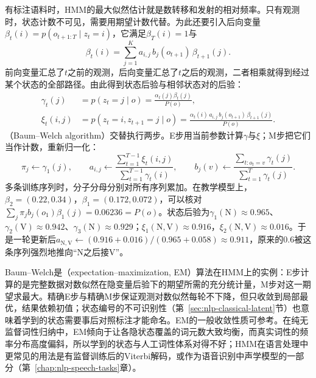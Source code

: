 有标注语料时，HMM的最大似然估计就是数转移和发射的相对频率。只有观测时，状态计数不可见，需要用期望计数代替。为此还要引入后向变量$\beta_t(i)=p(o_{t+1:T}\mid z_t=i)$，它满足$\beta_T(i)=1$与
\[
  \beta_t(i)=\sum_{j=1}^{K}a_{i,j}\,b_j(o_{t+1})\,\beta_{t+1}(j).
\]
前向变量汇总了$t$之前的观测，后向变量汇总了$t$之后的观测，二者相乘就得到经过某个状态的全部路径。由此得到状态后验与相邻状态对的后验：
\begin{equation}
  \begin{aligned}
    \gamma_t(j)&=p(z_t=j\mid o)=\frac{\alpha_t(j)\beta_t(j)}{P(o)},\\
    \xi_t(i,j)&=p(z_t=i,z_{t+1}=j\mid o)=\frac{\alpha_t(i)\,a_{i,j}\,b_j(o_{t+1})\,\beta_{t+1}(j)}{P(o)}.
  \end{aligned}
  \label{eq:nlp-classical-posteriors}
\end{equation}
（Baum--Welch algorithm）交替执行两步。E步用当前参数计算$\gamma$与$\xi$；M步把它们当作计数，重新归一化：
\begin{equation}
  \pi_j\gets\gamma_1(j),\qquad
  a_{i,j}\gets\frac{\sum_{t=1}^{T-1}\xi_t(i,j)}{\sum_{t=1}^{T-1}\gamma_t(i)},\qquad
  b_j(v)\gets\frac{\sum_{t:o_t=v}\gamma_t(j)}{\sum_{t=1}^{T}\gamma_t(j)}.
  \label{eq:nlp-classical-baum-welch}
\end{equation}
多条训练序列时，分子分母分别对所有序列累加。在教学模型上，$\beta_2=(0.22,0.34)$，$\beta_1=(0.172,0.072)$，可以核对$\sum_j\pi_jb_j(o_1)\beta_1(j)=0.06236=P(o)$。状态后验为$\gamma_1(\mathrm N)\approx0.965$、$\gamma_2(\mathrm V)\approx0.942$、$\gamma_3(\mathrm N)\approx0.929$；$\xi_1(\mathrm N,\mathrm V)\approx0.916$，$\xi_2(\mathrm N,\mathrm V)\approx0.016$。于是一轮更新后$a_{\mathrm N,\mathrm V}\gets(0.916+0.016)/(0.965+0.058)\approx0.911$，原来的$0.6$被这条序列强烈地推向“N之后接V”。

Baum--Welch是（expectation--maximization, EM）算法在HMM上的实例：E步计算的是完整数据对数似然在隐变量后验下的期望所需的充分统计量，M步对这一期望求最大。精确E步与精确M步保证观测对数似然每轮不下降，但只收敛到局部最优，结果依赖初值；状态编号的不可识别性（第~\ref{sec:nlp-classical-latent}节）也意味着学到的状态需要事后对照标注才能命名。EM的一般收敛性质可参考。在纯无监督词性归纳中，EM倾向于让各隐状态覆盖的词元数大致均衡，而真实词性的频率分布高度偏斜，所以学到的状态与人工词性体系对得不好；HMM在语言处理中更常见的用法是有监督训练后的Viterbi解码，或作为语音识别中声学模型的一部分（第~\ref{chap:nlp-speech-tasks}章）。

